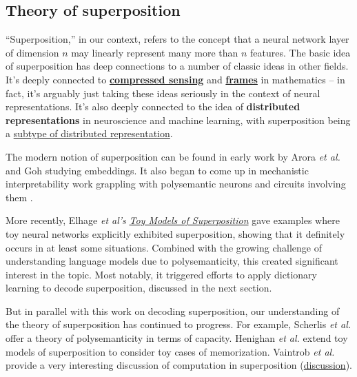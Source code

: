 \documentclass{article}
\let\oldsubsection\subsection
\renewcommand{\subsection}{\FloatBarrier\oldsubsection}
\begin{document}
\subsection{Theory of superposition}\label{sec:related-work-superposition}

“Superposition,” in our context, refers to the concept that a neural network layer of dimension $n$ may linearly represent many more than $n$ features. The basic idea of superposition has deep connections to a number of classic ideas in other fields. It's deeply connected to \textbf{\href{https://en.wikipedia.org/wiki/Compressed_sensing}{compressed sensing}} and \textbf{\href{https://en.wikipedia.org/wiki/Frame_(linear_algebra)}{frames}} in mathematics -- in fact, it's arguably just taking these ideas seriously in the context of neural representations. It's also deeply connected to the idea of \textbf{distributed representations} in neuroscience and machine learning, with superposition being a \href{https://transformer-circuits.pub/2023/superposition-composition/index.html}{subtype of distributed representation}.

The modern notion of superposition can be found in early work by Arora \textit{et al.} \cite{arora2018linear} and Goh \cite{goh2016decoding} studying embeddings. It also began to come up in mechanistic interpretability work grappling with polysemantic neurons and circuits involving them \cite{olah2020zoom}.

More recently, Elhage \textit{et al's} \textit{\href{https://transformer-circuits.pub/2022/toy_model/index.html}{Toy Models of Superposition}} \cite{elhage2022superposition} gave examples where toy neural networks explicitly exhibited superposition, showing that it definitely occurs in at least some situations. Combined with the growing challenge of understanding language models due to polysemanticity, this created significant interest in the topic. Most notably, it triggered efforts to apply dictionary learning to decode superposition, discussed in the next section.

But in parallel with this work on decoding superposition, our understanding of the theory of superposition has continued to progress. For example, Scherlis\textit{ et al.} \cite{scherlis2022polysemanticity} offer a theory of polysemanticity in terms of capacity. Henighan \textit{et al.} \cite{henighan2023superposition} extend toy models of superposition to consider toy cases of memorization. Vaintrob \textit{et al.} \cite{vaintrob2024computation} provide a very interesting discussion of computation in superposition (\href{https://transformer-circuits.pub/2024/march-update/index.html\#external-computation-in-superposition}{discussion}).
\end{document}
